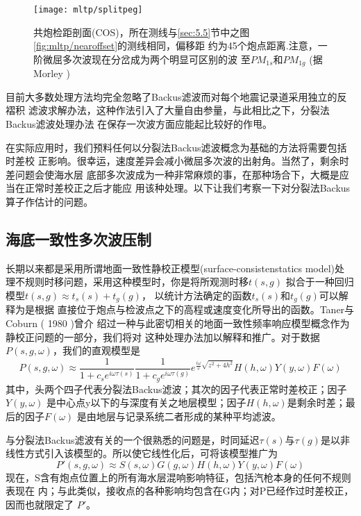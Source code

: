 \begin{figure}[H]
\centering
\texttt{[image: mltp/splitpeg]}
\caption[splitpeg]{
共炮检距剖面(COS)，所在测线与\ref{sec:5.5}节中之图\ref{fig:mltp/nearoffset}的测线相同，偏移距
约为45个炮点距离.注意，一阶微屈多次波现在分岔成为两个明显可区别的波
至$PM_{1s}$和$PM_{1g}$ (据Morley )
}
\label{fig:mltp/splitpeg}
\end{figure}

目前大多数处理方法均完全忽略了Backus滤波而对每个地震记录道采用独立的反褶积
滤波求解办法，这种作法引入了大量自由参量，与此相比之下，分裂法Backus滤波处理办法
在保存一次波方面应能起比较好的作甩。

在实际应用时，我们预料任何以分裂法Backus滤波概念为基础的方法将需要包括时差校
正影响。很幸运，速度差异会减小微屈多次波的出射角。当然了，剩余时差问题会使海水层
底部多次波成为一种非常麻烦的事，在那种场合下，大概是应当在正常时差校正之后才能应
用该种处理。以下让我们考察一下对分裂法Backus算子作估计的问题。

\subsection{海底一致性多次波压制}
\label{sec:5.6.7}

长期以来都是采用所谓地面一致性静校正模型(surface-consistenstatics model)处
理不规则时移问题，采用这种模型时，你是将所观测时移$t(s,g)$
拟合于一种回归模型$t(s,g)\approx t_s(s)+t_g(g)$，
以统计方法确定的函数$t_s(s)$和$t_g(g)$可以解释为是根据
直接位于炮点与检波点之下的高程或速度变化所导出的函数。Taner与Coburn (
1980 )曾介
绍过一种与此密切相关的地面一致性频率响应模型概念作为静校正问题的一部分，我们将对
这种处理办法加以解释和推广。对于数据$P(s,g,\omega)$，我们的直观模型是
\begin{equation}
P(s,g,\omega)\approx \frac{1}{1+c_se^{i\omega\tau(s)}}
\frac{1}{1+c_ge^{i\omega\tau(g)}}e^{\frac{i\omega}{v}\sqrt{z^2+4h^2}}
H(h,\omega)Y(y,\omega)F(\omega)
\label{eq:ex5.6.5}
\end{equation}
其中，头两个四子代表分裂法Backus滤波；其次的因子代表正常时差校正；因子$Y(y,\omega)$
是中心点y以下的与深度有关之地层模型；因子$H(h,\omega)$是剩余时差；最后的因子$F(\omega)$
是由地层与记录系统二者形成的某种平均滤波。

与分裂法Backus滤波有关的一个很熟悉的问题是，时同延迟$\tau(s)$与$\tau(g)$是以非线性方式引入该模型的。所以使它线性化后，可将该模型推广为
\begin{equation}
P'(s,g,\omega)\approx S(s,\omega)G(g,\omega)H(h,\omega)Y(y,\omega)F(\omega)
\label{eq:ex5.6.6}
\end{equation}
现在，S含有炮点位置上的所有海水层混响影响特征，包括汽枪本身的任何不规则表现在
内；与此类似，接收点的各种影响均包含在G内；对P已经作过时差校正，因而也就限定了
$P'$。

